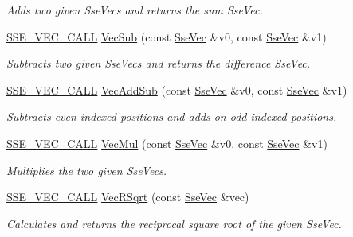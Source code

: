 \begin{DoxyCompactItemize}
\begin{DoxyCompactList}\small\item\em Adds two given Sse\+Vecs and returns the sum Sse\+Vec. \end{DoxyCompactList}\item 
\hyperlink{ssevec__math__defs_8h_a97454f977a5281455cecacce1e8ba670}{S\+S\+E\+\_\+\+V\+E\+C\+\_\+\+C\+A\+L\+L} \hyperlink{group___s_i_m_d_vec_math_ga6f3fc6f79d25a89eab0633445544af3f}{Vec\+Sub} (const \hyperlink{namespacegofxmath_a634570ddcd2496053ee966227080e02f}{Sse\+Vec} \&v0, const \hyperlink{namespacegofxmath_a634570ddcd2496053ee966227080e02f}{Sse\+Vec} \&v1)
\begin{DoxyCompactList}\small\item\em Subtracts two given Sse\+Vecs and returns the difference Sse\+Vec. \end{DoxyCompactList}\item 
\hyperlink{ssevec__math__defs_8h_a97454f977a5281455cecacce1e8ba670}{S\+S\+E\+\_\+\+V\+E\+C\+\_\+\+C\+A\+L\+L} \hyperlink{group___s_i_m_d_vec_math_gac6a154e8cd9fe66c30e8b2302815b0df}{Vec\+Add\+Sub} (const \hyperlink{namespacegofxmath_a634570ddcd2496053ee966227080e02f}{Sse\+Vec} \&v0, const \hyperlink{namespacegofxmath_a634570ddcd2496053ee966227080e02f}{Sse\+Vec} \&v1)
\begin{DoxyCompactList}\small\item\em Subtracts even-\/indexed positions and adds on odd-\/indexed positions. \end{DoxyCompactList}\item 
\hyperlink{ssevec__math__defs_8h_a97454f977a5281455cecacce1e8ba670}{S\+S\+E\+\_\+\+V\+E\+C\+\_\+\+C\+A\+L\+L} \hyperlink{group___s_i_m_d_vec_math_ga8bd586fb40d6514eb52c04f8ded33a74}{Vec\+Mul} (const \hyperlink{namespacegofxmath_a634570ddcd2496053ee966227080e02f}{Sse\+Vec} \&v0, const \hyperlink{namespacegofxmath_a634570ddcd2496053ee966227080e02f}{Sse\+Vec} \&v1)
\begin{DoxyCompactList}\small\item\em Multiplies the two given Sse\+Vecs. \end{DoxyCompactList}\item 
\hyperlink{ssevec__math__defs_8h_a97454f977a5281455cecacce1e8ba670}{S\+S\+E\+\_\+\+V\+E\+C\+\_\+\+C\+A\+L\+L} \hyperlink{group___s_i_m_d_vec_math_gae4bc9cf7c5e4eeddd2e8b3f869798033}{Vec\+R\+Sqrt} (const \hyperlink{namespacegofxmath_a634570ddcd2496053ee966227080e02f}{Sse\+Vec} \&vec)
\begin{DoxyCompactList}\small\item\em Calculates and returns the reciprocal square root of the given Sse\+Vec. \end{DoxyCompactList}\item 

\end{DoxyCompactItemize}

